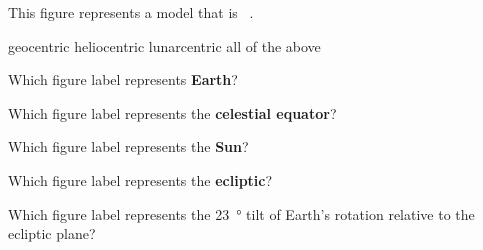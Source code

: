 \documentclass[addpoints]{exam}
\begin{document}
\begin{questions}
\question \label{ques:Figure2.7_start} 
This figure represents a model that is \fillin\ .
\begin{choices}
\correctchoice geocentric
\choice heliocentric
\choice lunarcentric
\choice all of the above
\end{choices}

\question
Which figure label represents \textbf{Earth}?

\begin{oneparchoices}
    \choice {}
    \choice {}
    \correctchoice {}
    \choice {}
    \choice {}
\end{oneparchoices}

\question
Which figure label represents the \textbf{celestial equator}?

\begin{oneparchoices}
    \correctchoice {}
    \choice {}
    \choice {}
    \choice {}
    \choice {}
\end{oneparchoices}

\question
Which figure label represents the \textbf{Sun}?

\begin{oneparchoices}
    \choice {}
    \choice {}
    \choice {}
    \choice {}
    \correctchoice {}
\end{oneparchoices}

\question 
Which figure label represents the \textbf{ecliptic}?

\begin{oneparchoices}
    \choice {}
    \choice {}
    \choice {}
    \correctchoice {}
    \choice {}
\end{oneparchoices}


\question \label{ques:Figure2.7_end} 
Which figure label represents the \SI{23}{\degree} tilt of Earth's rotation relative to the ecliptic plane?

\begin{oneparchoices}
    \choice {}
    \correctchoice {}
    \choice {}
    \choice {}
    \choice {}
\end{oneparchoices}



\end{questions}
\end{document}

